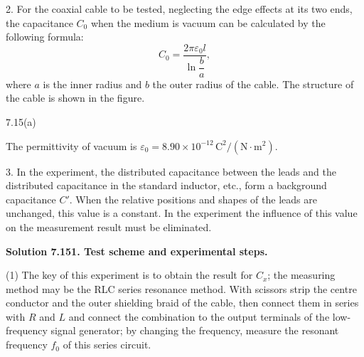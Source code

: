 2. For the coaxial cable to be tested, neglecting the edge effects at its two ends, the capacitance $C_0$ when the medium is vacuum can be calculated by the following formula:
\[
C_0=\frac{2\pi\varepsilon_0 l}{\ln\dfrac{b}{a}},
\]
where $a$ is the inner radius and $b$ the outer radius of the cable. The structure of the cable is shown in the figure.

\begin{figbox}{7.15(a)}
\end{figbox}

The permittivity of vacuum is $\varepsilon_0=8.90\times10^{-12}\,\mathrm{C^2/(N\cdot m^2)}$.

3. In the experiment, the distributed capacitance between the leads and the distributed capacitance in the standard inductor, etc., form a background capacitance $C'$. When the relative positions and shapes of the leads are unchanged, this value is a constant. In the experiment the influence of this value on the measurement result must be eliminated.

\textbf{Solution 7.15}\quad \textbf{1. Test scheme and experimental steps.}

(1) The key of this experiment is to obtain the result for $C_x$; the measuring method may be the RLC series resonance method. With scissors strip the centre conductor and the outer shielding braid of the cable, then connect them in series with $R$ and $L$ and connect the combination to the output terminals of the low-frequency signal generator; by changing the frequency, measure the resonant frequency $f_0$ of this series circuit.

